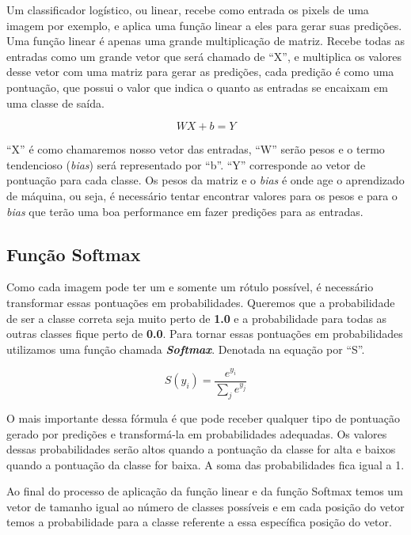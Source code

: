 Um classificador logístico, ou linear, recebe como entrada os pixels
de uma imagem por exemplo, e aplica uma função linear a eles para
gerar suas predições. Uma função linear é apenas uma grande
multiplicação de matriz. Recebe todas as entradas como um grande vetor
que será chamado de ``X'', e multiplica os valores desse vetor com uma
matriz para gerar as predições, cada predição é como uma pontuação,
que possui o valor que indica o quanto as entradas se encaixam em uma
classe de saída.

\begin{equation}
   WX + b = Y
\end{equation}

``X'' é como chamaremos nosso vetor das entradas, ``W'' serão pesos e
o termo tendencioso (\textit{bias}) será representado por ``b''. ``Y''
corresponde ao vetor de pontuação para cada classe. Os pesos da
matriz e o \textit{bias} é onde age o aprendizado de máquina, ou seja,
é necessário tentar encontrar valores para os pesos e para o
\textit{bias} que terão uma boa performance em fazer predições para as
entradas.

\subsection{Função Softmax}

Como cada imagem pode ter um e somente um rótulo possível, é necessário
transformar essas pontuações em probabilidades. Queremos que a
probabilidade de ser a classe correta seja muito perto de {\bf 1.0} e
a probabilidade para todas as outras classes fique perto de {\bf
  0.0}.
Para tornar essas pontuações em probabilidades utilizamos uma função
chamada {\bf \emph{Softmax}}. Denotada na equação por ``S''.

\begin{equation}
   S(y_i) = \displaystyle\frac{e^{y_i}}{\displaystyle\sum_{j} e^{y_j}}
\end{equation}

O mais importante dessa fórmula é que pode receber qualquer tipo de
pontuação gerado por predições e transformá-la em probabilidades
adequadas. Os valores dessas probabilidades serão altos quando a
pontuação da classe for alta e baixos quando a pontuação da classe for
baixa. A soma das probabilidades fica igual a 1.

Ao final do processo de aplicação da função linear e da função
Softmax temos um vetor de tamanho igual ao número de classes possíveis
e em cada posição do vetor temos a probabilidade para a classe
referente a essa específica posição do vetor.

